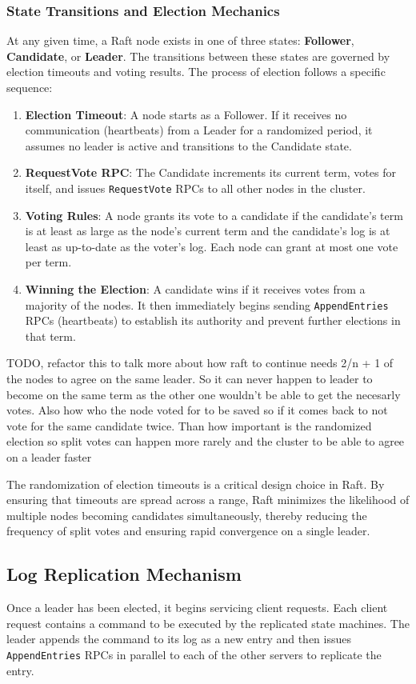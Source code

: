 \subsubsection{State Transitions and Election Mechanics}
At any given time, a Raft node exists in one of three states: \textbf{Follower}, \textbf{Candidate}, or \textbf{Leader}.
The transitions between these states are governed by election timeouts and voting results.
The process of election follows a specific sequence:
\begin{enumerate}
    \item \textbf{Election Timeout}: A node starts as a Follower. If it receives no communication (heartbeats) from a Leader for a randomized period, it assumes no leader is active and transitions to the Candidate state.
    \item \textbf{RequestVote RPC}: The Candidate increments its current term, votes for itself, and issues \texttt{RequestVote} RPCs to all other nodes in the cluster.
    \item \textbf{Voting Rules}: A node grants its vote to a candidate if the candidate's term is at least as large as the node's current term and the candidate's log is at least as up-to-date as the voter's log. Each node can grant at most one vote per term.
    \item \textbf{Winning the Election}: A candidate wins if it receives votes from a majority of the nodes. It then immediately begins sending \texttt{AppendEntries} RPCs (heartbeats) to establish its authority and prevent further elections in that term.
\end{enumerate}

TODO, refactor this to talk more about how raft to continue needs 2/n + 1 of the nodes to agree on the same leader. So it can never happen to leader to become on the same term as the other one wouldn't be able to get the necesarly votes. Also how who the node voted for to be saved so if it comes back to not vote for the same candidate twice. Than how important is the randomized election so split votes can happen more rarely and the cluster to be able to agree on a leader faster

The randomization of election timeouts is a critical design choice in Raft. By ensuring that timeouts are spread across a range, Raft minimizes the likelihood of multiple nodes becoming candidates simultaneously, thereby reducing the frequency of split votes and ensuring rapid convergence on a single leader.

\subsection{Log Replication Mechanism}
Once a leader has been elected, it begins servicing client requests. Each client request contains a command to be executed by the replicated state machines. The leader appends the command to its log as a new entry and then issues \texttt{AppendEntries} RPCs in parallel to each of the other servers to replicate the entry.

